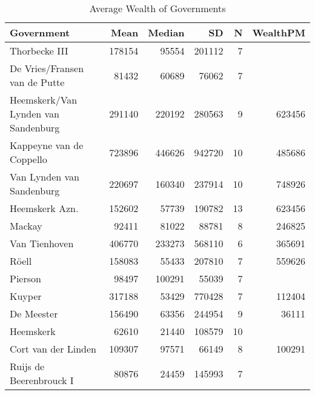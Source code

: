 \begin{table}[ht]
\centering
\begin{tabular}{lrrrrr}
  \hline
Government & Mean & Median & SD & N & WealthPM \\ 
  \hline
Thorbecke III & 178154 & 95554 & 201112 & 7 &  \\ 
  De Vries/Fransen van de Putte & 81432 & 60689 & 76062 & 7 &  \\ 
  Heemskerk/Van Lynden van Sandenburg & 291140 & 220192 & 280563 & 9 & 623456 \\ 
  Kappeyne van de Coppello & 723896 & 446626 & 942720 & 10 & 485686 \\ 
  Van Lynden van Sandenburg & 220697 & 160340 & 237914 & 10 & 748926 \\ 
  Heemskerk Azn. & 152602 & 57739 & 190782 & 13 & 623456 \\ 
  Mackay & 92411 & 81022 & 88781 & 8 & 246825 \\ 
  Van Tienhoven & 406770 & 233273 & 568110 & 6 & 365691 \\ 
  Röell & 158083 & 55433 & 207810 & 7 & 559626 \\ 
  Pierson & 98497 & 100291 & 55039 & 7 &  \\ 
  Kuyper & 317188 & 53429 & 770428 & 7 & 112404 \\ 
  De Meester & 156490 & 63356 & 244954 & 9 & 36111 \\ 
  Heemskerk & 62610 & 21440 & 108579 & 10 &  \\ 
  Cort van der Linden & 109307 & 97571 & 66149 & 8 & 100291 \\ 
  Ruijs de Beerenbrouck I & 80876 & 24459 & 145993 & 7 &  \\ 
   \hline
\end{tabular}
\caption{Average Wealth of Governments} 
\end{table}

